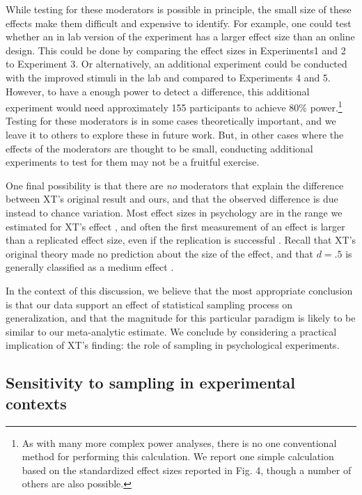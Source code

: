 \documentclass[man]{apa2}
\begin{document}
While testing for these moderators is possible in principle, the small size of these effects make them difficult and expensive to identify. For example, one could  test whether an in lab version of the experiment has a larger effect size than an online design. This could be done by comparing the effect sizes in Experiments1 and 2 to Experiment 3. Or alternatively, an additional experiment could be conducted with the improved stimuli in the lab and compared to Experiments 4 and 5. However, to have a enough power to detect a difference, this additional experiment would need approximately 155 participants to achieve 80\% power.\footnote{As with many more complex power analyses, there is no one conventional method for performing this calculation. We report one simple calculation based on the standardized effect sizes reported in Fig. 4, though a number of others are also possible.} Testing for these moderators is in some cases theoretically important, and we leave it to others to explore these in future work. But, in other cases where the effects of the moderators are thought to be small, conducting additional experiments to test for them may not be a fruitful exercise.


One final possibility is that there are \emph{no} moderators that explain the difference between XT's original result and ours, and that the observed difference is due instead to chance variation. Most effect sizes in psychology are in the range we estimated for XT's effect \cite{richard2003}, and often the first measurement of an effect is larger than a replicated effect size, even if the replication is successful \cite{reproProj2015}. Recall that XT's original theory made no prediction about the size of the effect, and that $d=.5$ is generally classified as a medium effect \cite{cohen1992}.

In the context of this discussion, we believe that the most appropriate conclusion is that our data support an effect of statistical sampling process on generalization, and that the magnitude for this particular paradigm is likely to be similar to our meta-analytic estimate. We conclude by considering a practical implication of XT's finding: the role of sampling in psychological experiments.

\subsection{Sensitivity to sampling in experimental contexts}
\end{document}
